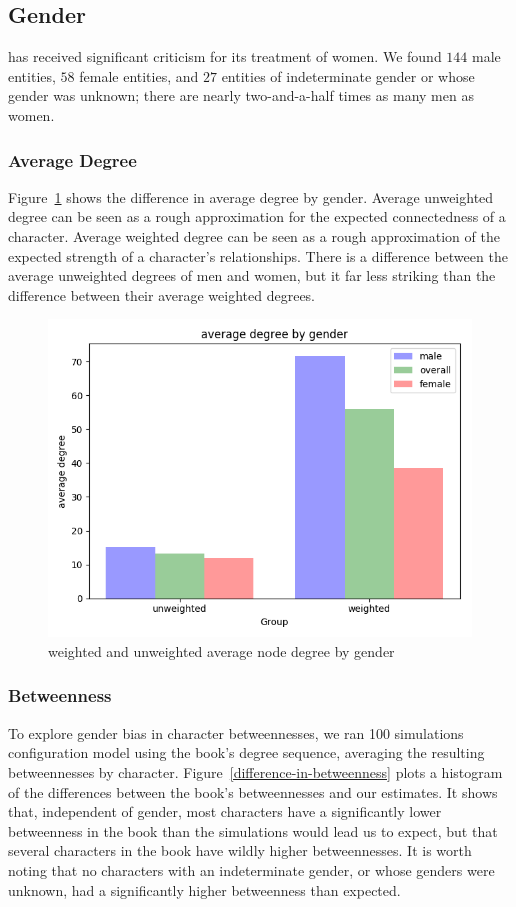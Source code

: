 \subsection{Gender}

\infinitejest has received significant criticism for its treatment of women.\cite{hayes-brady_2017} We found $144$ male entities, $58$ female entities, and $27$ entities of indeterminate gender or whose gender was unknown; there are nearly two-and-a-half times as many men as women.

\subsubsection{Average Degree}
Figure~\ref{average-node-degree-by-gender} shows the difference in average degree by gender. Average unweighted degree can be seen as a rough approximation for the expected connectedness of a character. Average weighted degree can be seen as a rough approximation of the expected strength of a character's relationships. There is a difference between the average unweighted degrees of men and women, but it far less striking than the difference between their average weighted degrees. 

\begin{figure}[ht!]
    \centering
    \includegraphics[width=.4 \textwidth]{images/gender_degrees.png}
    \caption{weighted and unweighted average node degree by gender}
    \label{average-node-degree-by-gender}
\end{figure}

\subsubsection{Betweenness}
To explore gender bias in character betweennesses, we ran 100 simulations configuration model using the book's degree sequence, averaging the resulting betweennesses by character. Figure~\ref{difference-in-betweenness} plots a histogram of the differences between the book's betweennesses and our estimates. It shows that, independent of gender, most characters have a significantly lower betweenness in the book than the simulations would lead us to expect, but that several characters in the book have wildly higher betweennesses. It is worth noting that no characters with an indeterminate gender, or whose genders were unknown, had a significantly higher betweenness than expected.

